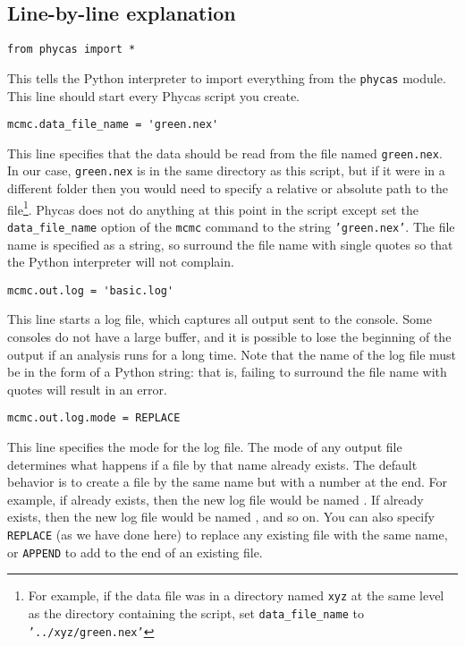 \documentclass[10pt]{article}
\newcommand{\code}[1]{{\tt #1}}				%
\newcommand{\cmd}[1]{{\tt \small #1}\index{#1}}		%
\newcommand{\opt}[1]{{\tt \small #1}\index{#1}}		%
\begin{document}
\subsection{Line-by-line explanation} \label{subsec:basicpyexplanation}

\begin{verbatim}
from phycas import *
\end{verbatim}
%
This tells the Python interpreter to import everything from the \code{phycas} module. This line should start every Phycas script you create.
%
\begin{verbatim}
mcmc.data_file_name = 'green.nex'
\end{verbatim}
%
This line specifies that the data should be read from the file named {\tt green.nex}. In our case, {\tt green.nex} is in the same directory as this script, but if it were in a different folder then you would need to specify a relative or absolute path to the file\footnote{
%
For example, if the data file was in a directory named {\tt xyz} at the same level as the directory containing the script, set \opt{data\_file\_name} to {\tt '../xyz/green.nex'} }.
%
Phycas does not do anything at this point in the script except set the \opt{data\_file\_name} option of the \cmd{mcmc} command to the string \code{'green.nex'}. The file name is specified as a string, so surround the file name with single quotes so that the Python interpreter will not complain. 
%
\begin{verbatim}
mcmc.out.log = 'basic.log'
\end{verbatim}
%
This line starts a log file, which captures all output sent to the console. Some consoles do not have a large buffer, and it is possible to lose the beginning of the output if an analysis runs for a long time. Note that the name of the log file must be in the form of a Python string: that is, failing to surround the file name with quotes will result in an error.
%
\begin{verbatim}
mcmc.out.log.mode = REPLACE
\end{verbatim}
%
This line specifies the mode for the log file. The mode of any output file determines what happens if a file by that name already exists. The default behavior is to create a file by the same name but with a number at the end. For example, if  already exists, then the new log file would be named . If  already exists, then the new log file would be named , and so on. You can also specify \code{REPLACE} (as we have done here) to replace any existing file with the same name, or \code{APPEND} to add to the end of an existing file. 
\end{document}
